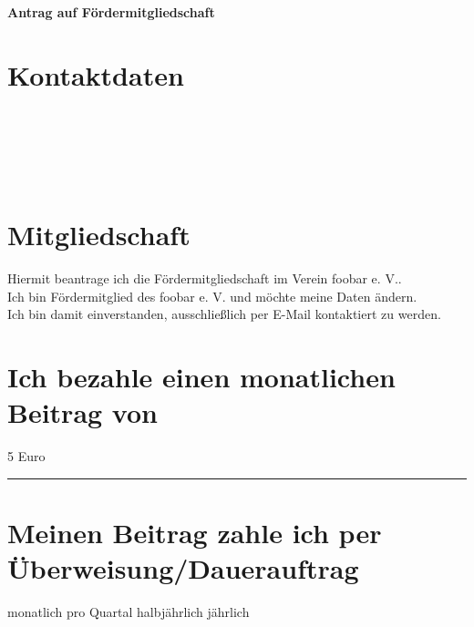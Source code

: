 

\pagestyle{empty}


\begin{Form}
\noindent\textbf{\Huge Antrag auf Fördermitgliedschaft}\\
\section*{Kontaktdaten}
\\[3mm]
\\[3mm]
\\[3mm]
\\[3mm]

\section*{Mitgliedschaft}
\CheckBox[name=1,bordercolor=black]{} Hiermit beantrage ich die Fördermitgliedschaft im Verein foobar e. V..\\[1mm]
\CheckBox[name=2,bordercolor=black]{} Ich bin Fördermitglied des foobar e. V. und möchte meine Daten ändern.\\[1mm]
\CheckBox[name=3,bordercolor=black]{} Ich bin damit einverstanden, ausschließlich per E-Mail kontaktiert zu werden.

\section*{Ich bezahle einen monatlichen Beitrag von}
\CheckBox[name=4,bordercolor=black]{} 5 Euro\qquad
\CheckBox[name=5,bordercolor=black]{} \noindent\rule{30mm}{0.4pt}

\section*{Meinen Beitrag zahle ich per Überweisung/Dauerauftrag}
\CheckBox[name=6,bordercolor=black]{} monatlich\qquad
\CheckBox[name=7,bordercolor=black]{} pro Quartal\qquad
\CheckBox[name=8,bordercolor=black]{} halbjährlich\qquad
\CheckBox[name=9,bordercolor=black]{} jährlich


\end{Form}
